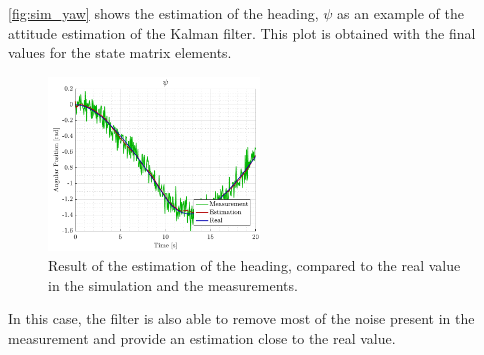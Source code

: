 \autoref{fig:sim_yaw} shows the estimation of the heading, $\psi$ as an example of the attitude estimation of the Kalman filter. This plot is obtained with the final values for the state matrix elements.
\begin{figure}[H]
    \includegraphics[width=0.5\textwidth]{figures/sim_yaw}
    \caption{Result of the estimation of the heading, compared to the real value in the simulation and the measurements.}
    \label{fig:sim_yaw}
\end{figure}
In this case, the filter is also able to remove most of the noise present in the measurement and provide an estimation close to the real value. 
%

%
%
%
